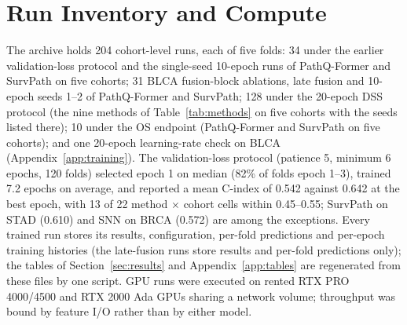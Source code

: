\documentclass{article}
\newcommand{\pq}{PathQ-Former}
\newcommand{\cindex}{C-index}
\begin{document}
\section{Run Inventory and Compute}
\label{app:runs}
The archive holds 204 cohort-level runs, each of five folds: 34 under the earlier validation-loss protocol and the single-seed 10-epoch runs of \pq{} and SurvPath on five cohorts; 31 BLCA fusion-block ablations, late fusion and 10-epoch seeds 1--2 of \pq{} and SurvPath; 128 under the 20-epoch DSS protocol (the nine methods of Table~\ref{tab:methods} on five cohorts with the seeds listed there); 10 under the OS endpoint (\pq{} and SurvPath on five cohorts); and one 20-epoch learning-rate check on BLCA (Appendix~\ref{app:training}). The validation-loss protocol (patience 5, minimum 6 epochs, 120 folds) selected epoch 1 on median (82\% of folds epoch 1--3), trained 7.2 epochs on average, and reported a mean \cindex{} of 0.542 against 0.642 at the best epoch, with 13 of 22 method $\times$ cohort cells within 0.45--0.55; SurvPath on STAD (0.610) and SNN on BRCA (0.572) are among the exceptions. Every trained run stores its results, configuration, per-fold predictions and per-epoch training histories (the late-fusion runs store results and per-fold predictions only); the tables of Section~\ref{sec:results} and Appendix~\ref{app:tables} are regenerated from these files by one script. GPU runs were executed on rented RTX PRO 4000/4500 and RTX 2000 Ada GPUs sharing a network volume; throughput was bound by feature I/O rather than by either model.
\end{document}
